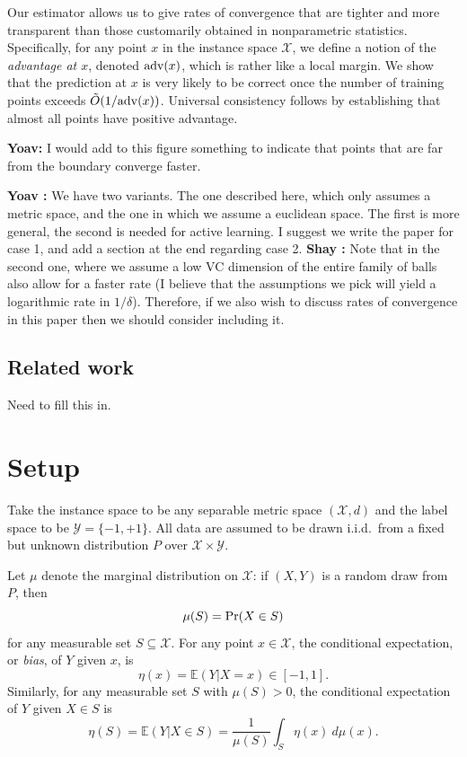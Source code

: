 \documentclass{article}
\def\pr{{\rm Pr}}
\def\E{{\mathbb E}}
\def\X{{\mathcal X}}
\def\Y{{\mathcal Y}}
\def\adv{{\rm adv}}
\newcommand{\comment}[3]{{\color{#1} {\bf #2 :} #3}}
\newcommand{\shay}[1]{\comment{purple}{Shay}{#1}}
\newcommand{\yoav}[1]{\comment{green}{Yoav}{#1}}
\begin{document}
Our estimator allows us to give rates of convergence that are tighter and more 
transparent than those customarily obtained in nonparametric statistics. Specifically, for any point $x$ in the instance space $\X$, we define a notion of the {\it advantage at $x$}, denoted $\adv(x)$, which is rather like a local margin. We show that the prediction at $x$ is very likely to be correct once the number of training points exceeds $\tilde{O}(1/\adv(x))$. Universal consistency follows by establishing that almost all points have positive advantage.

{\bf Yoav:} I would add to this figure something to indicate that
points that are far from the boundary converge faster.

\yoav{We have two variants. The one described here, which
  only assumes a metric space, and the one in which we assume a
  euclidean space. The first is more general, the second is needed for
  active learning. I suggest we write the paper for case 1, and add a
  section at the end regarding case 2.}  \shay{Note that in the second
  one, where we assume a low VC dimension of the entire family of
  balls also allow for a faster rate (I believe that the assumptions
  we pick will yield a logarithmic rate in $1/\delta$). Therefore, if
  we also wish to discuss rates of convergence in this paper then we
  should consider including it.} 
  
\subsection{Related work}

Need to fill this in.

\section{Setup}

Take the instance space to be any separable metric space $(\X, d)$ and the label space to be $\Y = \{-1,+1\}$. All data are assumed to be drawn i.i.d.\ from a fixed but unknown distribution $P$ over $\X \times \Y$.

Let $\mu$ denote the marginal distribution on $\X$: if $(X,Y)$ is a 
random draw from $P$, then
$$ \mu(S) = \pr(X \in S)$$
for any measurable set $S \subseteq \X$. For any point $x \in \X$, the conditional expectation, or {\em bias}, of $Y$ given $x$, is
$$ \eta(x) = \E(Y| X = x) \in [-1,1] .$$ 
Similarly, for any measurable set $S$ with $\mu(S) > 0$, the
conditional expectation of $Y$ given $X \in S$ is
$$ \eta(S) = \E(Y| X \in S) = \frac{1}{\mu(S)} \int_S \eta(x) \ d \mu(x) .$$
\end{document}
